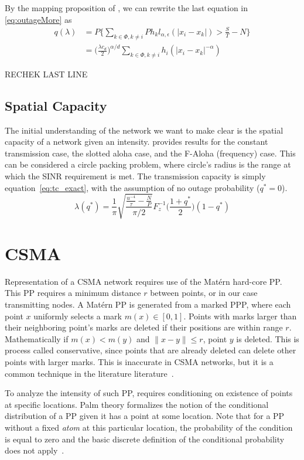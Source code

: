 %
By the mapping proposition of \cite{Weber2012}, we can rewrite the last equation in \eqref{eq:outageMore} as
%
\begin{equation}\label{eq:outageMapped}
  \begin{split}
  q(\lambda) &= P\Big\{\sum_{k\in \Phi,k\neq i} Ph_kl_{\alpha,\epsilon}(|x_i-x_k|) > \frac{S}{T} - N\Big\} \\
  &= \Big(\frac{\lambda c_d}{2}\Big)^{\alpha/d}\sum_{k\in \Phi,k\neq i}h_i (|x_i-x_k|^{-\alpha})
\end{split}
\end{equation}\par
%
RECHEK LAST LINE
%
\subsection{Spatial Capacity}
%
The initial understanding of the network we want to make clear is the spatial capacity of a network given an intensity.  \cite{Weber2012} provides results for the constant transmission case, the slotted aloha case, and the F-Aloha (frequency) case.  This can be considered a circle packing problem, where circle's radius is the range at which the SINR requirement is met.  The transmission capacity is simply equation~\eqref{eq:tc_exact}, with the assumption of no outage probability ($q^*=0$).
%
\begin{equation}\label{eq:tc_exact}
  \lambda(q^*) = \frac{1}{\pi} \sqrt{\frac{ \frac{u^{-4}}{\tau} -\frac{N}{P}}{\pi/2} } F_z^{-1}\Big(\frac{1+q^*}{2}\Big)(1-q^*)
\end{equation}
%
\section{CSMA}
%
Representation of a CSMA network requires use of the Mat\'ern hard-core PP.  This PP requires a minimum distance $r$ between points, or in our case transmitting nodes.  A Mat\'ern PP is generated from a marked PPP, where each point $x$ uniformly selects a mark $m(x)\in[0,1]$.  Points with marks larger than their neighboring point's marks are deleted if their positions are within range $r$.  Mathematically if $m(x)<m(y)$ and $\|x-y\| \leq r$, point $y$ is deleted.  This is process called conservative, since points that are already deleted can delete other points with larger marks. This is inaccurate in CSMA networks, but it is a common technique in the literature literature~\cite{Nguyen2007}.\par
%
To analyze the intensity of such PP, requires conditioning on existence of points at specific locations.  Palm theory formalizes the notion of the conditional distribution of a PP given it has a point at some location. Note that for a PP without a fixed \textit{atom} at this particular location, the probability of the condition is equal to zero and the basic discrete definition of the conditional probability does not apply~\cite{baccelli2009stochastic}.\par
%
\fi %
